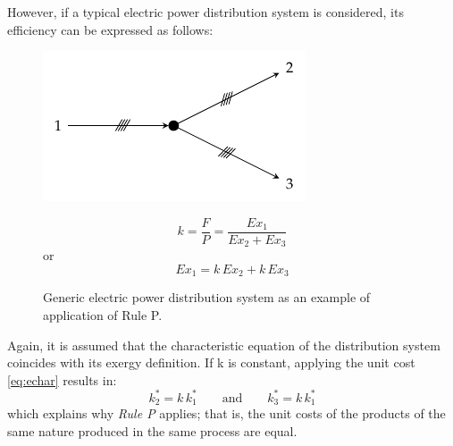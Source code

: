 \documentclass[energies,article,submit,moreauthors,pdftex]{Definitions/mdpi}
\begin{document}
However, if a typical electric power distribution system is considered, its efficiency can be expressed as follows:
\begin{figure}[ht]
  \begin{minipage}[c]{0.50\linewidth}
   \centering
    \includegraphics[width=0.8\linewidth]{distribucion}
  \end{minipage}
  \begin{minipage}[c]{0.48\linewidth}
    \centering
    \begin{equation*}
        k=\frac{F}{P}=\frac{Ex_1}{Ex_2+Ex_3}
        \label{eq:dist}
    \end{equation*}
    or
    \begin{equation*}
        Ex_1=k\,Ex_2+k\,Ex_3
    \end{equation*}
  \end{minipage}
  \caption{Generic electric power distribution system as an example of application of Rule P.}
  \label{fig:distributor}
\end{figure}

Again, it is assumed that the characteristic equation of the distribution system coincides with its exergy definition. If k is constant, applying the unit cost \cref{eq:echar} results in:
\begin{equation}
    k_2^*=k\,k_1^*     \qquad \text{and}\qquad    k_3^*=k\,k_1^*
\end{equation}
which explains why \emph{Rule P} applies; that is, the unit costs of the products of the same nature produced in the same process are equal.
\end{document}
